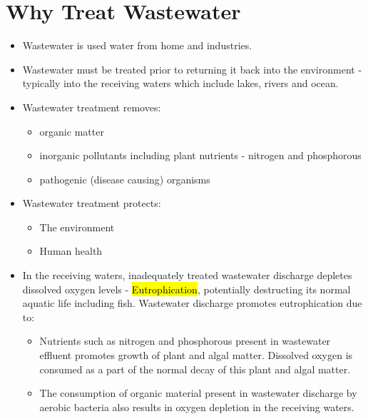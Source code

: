 \section{Why Treat Wastewater}
\begin{itemize}
\item Wastewater is used water from home and industries.\\
\item Wastewater must be treated prior to returning it back into the environment - typically into the receiving waters which include lakes, rivers and ocean.


\item Wastewater treatment removes:
\begin{itemize}
\item organic matter
\item inorganic  pollutants including plant nutrients - nitrogen and phosphorous\\
\item pathogenic (disease causing) organisms\\
\end{itemize}

\item Wastewater treatment protects:
\begin{itemize}
\item The environment
\item Human health
\end{itemize}

\item In the receiving waters, inadequately treated wastewater discharge depletes dissolved oxygen levels - \hl{Eutrophication}, potentially destructing its normal aquatic life including fish.  Wastewater discharge promotes eutrophication due to:

\begin{itemize}
\item Nutrients such as nitrogen and phosphorous present in wastewater effluent promotes growth of plant and algal matter.  Dissolved oxygen is consumed as a part of the normal decay of this plant and algal matter.  
\item The consumption of organic material present in wastewater discharge by aerobic bacteria also results in oxygen depletion in the receiving waters.  


\end{itemize}
\end{itemize}

